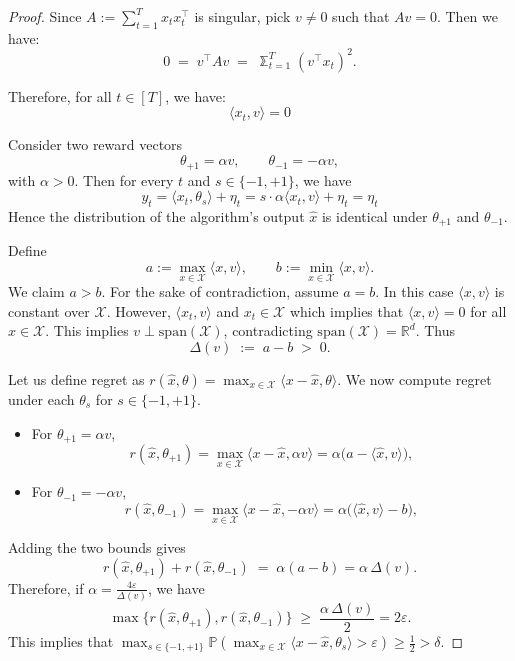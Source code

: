 \begin{proof}
    Since $A:=\sum_{t=1}^T x_tx_t^\top$ is singular, pick $v\neq 0$ such that $Av=0$. Then we have:
\[
0 \;=\; v^\top Av \;=\; \mathbb \sum_{t=1}^T (v^\top x_t)^2.
\]

Therefore, for all $t\in[T]$, we have:
\[
\langle x_t,v\rangle=0
\]

\medskip
Consider two reward vectors
\[
\theta_{+1}=\alpha v,\qquad \theta_{-1}=-\alpha v,
\]
with $\alpha>0$. Then for every $t$ and $s\in \{-1,+1\}$, we have
\[
y_t=\langle x_t,\theta_s\rangle+\eta_t
=s\cdot\alpha\langle x_t,v\rangle+\eta_t
=\eta_t
\]
Hence the distribution of the algorithm's output $\hat x$ is identical under
$\theta_{+1}$ and $\theta_{-1}$.

Define
\[
a:=\max_{x\in \mathcal X}\langle x,v\rangle,\qquad
b:=\min_{x\in \mathcal X}\langle x,v\rangle.
\]
We claim $a>b$. For the sake of contradiction, assume $a=b$. In this case $\langle x,v\rangle$ is constant over $\mathcal X$. However, $\langle x_t,v\rangle$ and $x_t\in \mathcal{X}$ which implies that $\langle x,v\rangle=0$ for all $x\in\mathcal X$. This implies
$v\perp \mathrm{span}(\mathcal X)$, contradicting $\mathrm{span}(\mathcal X)=\mathbb R^d$.
Thus
\[
\Delta(v)\;:=\;a-b\;>\;0.
\]

Let us define regret as $r(\hat x,\theta)=\max_{x\in\mathcal X}\langle x-\hat x,\theta\rangle$. We now compute regret under each $\theta_s$ for $s\in\{-1,+1\}$. 

\begin{itemize}
\item For $\theta_{+1}=\alpha v$,
\[
r(\hat x,\theta_{+1})
=\max_{x\in\mathcal X}\langle x-\hat x,\alpha v\rangle
=\alpha\Big(a-\langle \hat x,v\rangle\Big),
\]

\item For $\theta_{-1}=-\alpha v$,
\[
r(\hat x,\theta_{-1})
=\max_{x\in\mathcal X}\langle x-\hat x,-\alpha v\rangle
=\alpha\Big(\langle \hat x,v\rangle-b\Big),
\]
\end{itemize}

Adding the two bounds gives
\[
r(\hat x,\theta_{+1})+r(\hat x,\theta_{-1})
\;=\;\alpha(a-b)=\alpha\,\Delta(v).
\]
Therefore, if $\alpha=\frac{4\varepsilon}{\Delta(v)}$, we have
\[
\max\Big\{r(\hat x,\theta_{+1}),r(\hat x,\theta_{-1})\Big\}
\;\ge\;\frac{\alpha\,\Delta(v)}{2}=2\varepsilon.
\]
This implies that $\max_{s\in\{-1,+1\}}\mathbb{P}(\max_{x\in\mathcal{X}}\langle x-\hat x,\theta_s\rangle> \varepsilon)\geq \frac{1}{2}>\delta.$
\end{proof}


